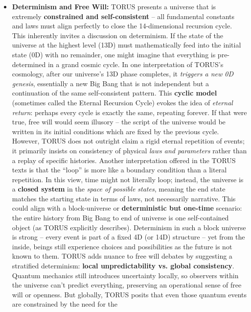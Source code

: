 \begin{itemize}
\item
  \textbf{Determinism and Free Will:} TORUS presents a universe that is
  extremely \textbf{constrained and self-consistent} -- all fundamental
  constants and laws must align perfectly to close the 14-dimensional
  recursion cycle​. This inherently invites a discussion on determinism.
  If the state of the universe at the highest level (13D) must
  mathematically feed into the initial state (0D) with no remainder, one
  might imagine that everything is pre-determined in a grand cosmic
  cycle. In one interpretation of TORUS's cosmology, after our
  universe's 13D phase completes, it \emph{triggers a new 0D genesis},
  essentially a new Big Bang that is not independent but a continuation
  of the same self-consistent pattern​. This \textbf{cyclic model}
  (sometimes called the Eternal Recursion Cycle) evokes the idea of
  \emph{eternal return}: perhaps every cycle is exactly the same,
  repeating forever. If that were true, free will would seem illusory --
  the script of the universe would be written in its initial conditions
  which are fixed by the previous cycle. However, TORUS does not
  outright claim a rigid eternal repetition of events; it primarily
  insists on consistency of physical \emph{laws and parameters} rather
  than a replay of specific histories. Another interpretation offered in
  the TORUS texts is that the ``loop'' is more like a boundary condition
  than a literal repetition​. In this view, time might not literally
  loop; instead, the universe is a \textbf{closed system} in the
  \emph{space of possible states}, meaning the end state matches the
  starting state in terms of laws, not necessarily narrative. This could
  align with a block-universe or \textbf{deterministic but one-time}
  scenario: the entire history from Big Bang to end of universe is one
  self-contained object (as TORUS explicitly describes)​. Determinism in
  such a block universe is strong -- every event is part of a fixed 4D
  (or 14D) structure -- yet from the inside, beings still experience
  choices and possibilities as the future is not known to them. TORUS
  adds nuance to free will debates by suggesting a stratified
  determinism: \textbf{local unpredictability vs. global consistency}.
  Quantum mechanics still introduces uncertainty locally, so observers
  within the universe can't predict everything, preserving an
  operational sense of free will or openness. But globally, TORUS posits
  that even those quantum events are constrained by the need for the

\end{itemize}
